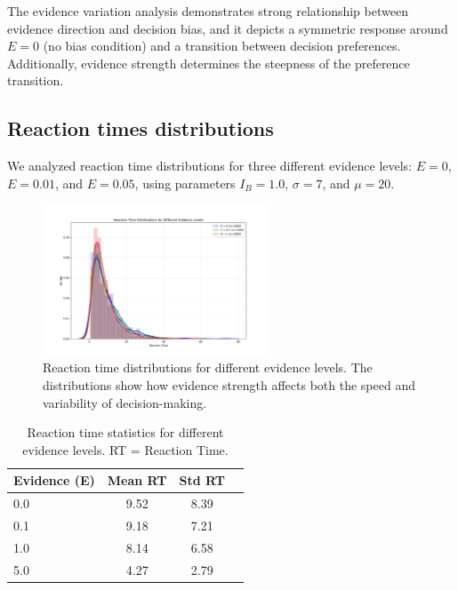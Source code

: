 \documentclass[11pt,a4paper]{article}
\begin{document}
The evidence variation analysis demonstrates strong relationship between evidence direction and decision bias, 
 and it depicts a symmetric response around $E = 0$ (no bias condition) and a transition between decision preferences. 
Additionally, evidence strength determines the steepness of the preference transition.

\subsection{Reaction times distributions}

We analyzed reaction time distributions for three different evidence levels: $E = 0$, $E = 0.01$, and $E = 0.05$, using parameters $I_B = 1.0$, $\sigma = 7$, and $\mu = 20$.

\begin{figure}[H]
    \centering
    \includegraphics[width=0.6\textwidth]{ddm_combined_reaction_times.png}
    \caption{Reaction time distributions for different evidence levels. The distributions show how evidence strength affects both the speed and variability of decision-making.}
    \label{fig:reaction_times}
\end{figure}

\begin{table}[H]
    \centering
    \begin{tabular}{@{}lccc@{}}
        \toprule
        Evidence (E) & Mean RT & Std RT \\
        \midrule
        0.0 & 9.52 & 8.39 \\
        0.1 & 9.18 & 7.21 \\
        1.0 & 8.14 & 6.58 \\
        5.0 & 4.27 & 2.79 \\
        \bottomrule
    \end{tabular}
    \caption{Reaction time statistics for different evidence levels. RT = Reaction Time.}
    \label{tab:reaction_times}
\end{table}
\end{document}
